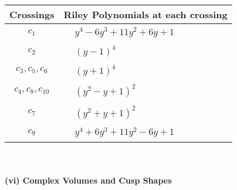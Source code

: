 \documentclass[1p]{elsarticle_modified}
\theoremstyle{definition}
\begin{document}
\begin{tabular}{m{50pt}|m{274pt}}
Crossings & \hspace{64pt}Riley Polynomials at each crossing \\
\hline $$\begin{aligned}c_{1}\end{aligned}$$&$\begin{aligned}
&y^4-6 y^3+11 y^2+6 y+1
\end{aligned}$\\
\hline $$\begin{aligned}c_{2}\end{aligned}$$&$\begin{aligned}
&(y-1)^4
\end{aligned}$\\
\hline $$\begin{aligned}c_{3},c_{5},c_{6}\end{aligned}$$&$\begin{aligned}
&(y+1)^4
\end{aligned}$\\
\hline $$\begin{aligned}c_{4},c_{8},c_{10}\end{aligned}$$&$\begin{aligned}
&(y^2- y+1)^2
\end{aligned}$\\
\hline $$\begin{aligned}c_{7}\end{aligned}$$&$\begin{aligned}
&(y^2+y+1)^2
\end{aligned}$\\
\hline $$\begin{aligned}c_{9}\end{aligned}$$&$\begin{aligned}
&y^4+6 y^3+11 y^2-6 y+1
\end{aligned}$\\
\hline
\end{tabular}\\~\\
\newpage\flushleft \textbf{(vi) Complex Volumes and Cusp Shapes}
\end{document}
